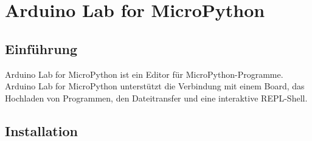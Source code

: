 %
%
%


\chapter{Arduino Lab for MicroPython} \label{ArduinoLab}

\section{Einführung}

Arduino Lab for MicroPython ist ein Editor für MicroPython-Programme. Arduino Lab for MicroPython unterstützt die Verbindung mit einem Board, das Hochladen von Programmen, den Dateitransfer und eine interaktive REPL-Shell.

\section{Installation}

